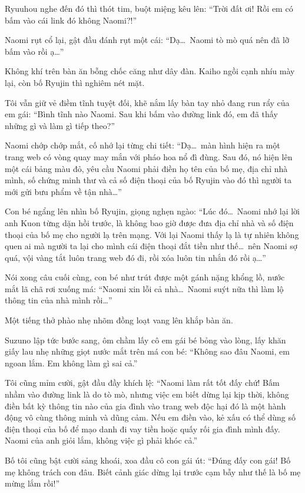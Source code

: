 \documentclass[../main.tex]{subfiles}
\begin{document}
Ryuuhou nghe đến đó thì thót tim, buột miệng kêu lên: ``Trời đất ơi! Rồi em có bấm vào cái link đó không Naomi?!''

Naomi rụt cổ lại, gật đầu đánh rụt một cái: ``Dạ\dots\ Naomi tò mò quá nên đã lỡ bấm vào rồi ạ\dots''

Không khí trên bàn ăn bỗng chốc căng như dây đàn. Kaiho ngồi cạnh nhíu mày lại, còn bố Ryujin thì nghiêm nét mặt.

Tôi vẫn giữ vẻ điềm tĩnh tuyệt đối, khẽ nắm lấy bàn tay nhỏ đang run rẩy của em gái: ``Bình tĩnh nào Naomi. Sau khi bấm vào đường link đó, em đã thấy những gì và làm gì tiếp theo?''

Naomi chớp chớp mắt, cố nhớ lại từng chi tiết: ``Dạ\dots\ màn hình hiện ra một trang web có vòng quay may mắn với pháo hoa nổ đì đùng. Sau đó, nó hiện lên một cái bảng màu đỏ, yêu cầu Naomi phải điền họ tên của bố mẹ, địa chỉ nhà mình, số chứng minh thư và cả số điện thoại của bố Ryujin vào đó thì người ta mới gửi bưu phẩm về tận nhà\dots''

Con bé ngẩng lên nhìn bố Ryujin, giọng nghẹn ngào: ``Lúc đó\dots\ Naomi nhớ lại lời anh Kuon từng dặn hồi trước, là không bao giờ được đưa địa chỉ nhà và số điện thoại của bố mẹ cho người lạ trên mạng. Với lại Naomi thấy lạ là tự nhiên không quen ai mà người ta lại cho mình cái điện thoại đắt tiền như thế\dots\ nên Naomi sợ quá, vội vàng tắt luôn trang web đó đi, rồi xóa luôn tin nhắn đó rồi ạ\dots''

Nói xong câu cuối cùng, con bé như trút được một gánh nặng khổng lồ, nước mắt lã chã rơi xuống má: ``Naomi xin lỗi cả nhà\dots\ Naomi suýt nữa thì làm lộ thông tin của nhà mình rồi\dots''

Một tiếng thở phào nhẹ nhõm đồng loạt vang lên khắp bàn ăn.

Suzuno lập tức bước sang, ôm chầm lấy cô em gái bé bỏng vào lòng, lấy khăn giấy lau nhẹ những giọt nước mắt trên má con bé: ``Không sao đâu Naomi, em ngoan lắm. Em không làm gì sai cả.''

Tôi cũng mỉm cười, gật đầu đầy khích lệ: ``Naomi làm rất tốt đấy chứ! Bấm nhầm vào đường link là do tò mò, nhưng việc em biết dừng lại kịp thời, không điền bất kỳ thông tin nào của gia đình vào trang web độc hại đó là một hành động vô cùng thông minh và dũng cảm. Nếu em điền vào, kẻ xấu có thể dùng số điện thoại của bố để mạo danh đi vay tiền hoặc quấy rối gia đình mình đấy. Naomi của anh giỏi lắm, không việc gì phải khóc cả.''

Bố tôi cũng bật cười sảng khoái, xoa đầu cô con gái út: ``Đúng đấy con gái! Bố mẹ không trách con đâu. Biết cảnh giác dừng lại trước cạm bẫy như thế là bố mẹ mừng lắm rồi!''
\end{document}
